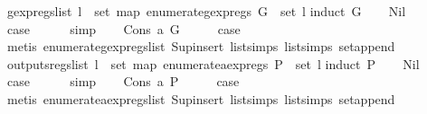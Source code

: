 \begin{isabellebody}
\ gexp{\isacharunderscore}regs{\isacharunderscore}list{\isacharcolon}\ {\isachardoublequoteopen}{\isasymexists}l{\isachardot}\ {\isasymUnion}\ {\isacharparenleft}set\ {\isacharparenleft}map\ enumerate{\isacharunderscore}gexp{\isacharunderscore}regs\ G{\isacharparenright}{\isacharparenright}\ {\isacharequal}\ set\ l{\isachardoublequoteclose}\isanewline
%
\isadelimproof
%
\endisadelimproof
%
\isatagproof
{}\isamarkupfalse%
{\isacharparenleft}induct\ G{\isacharparenright}\isanewline
\ \ \isamarkupfalse%
\ Nil\isanewline
\ \ \isamarkupfalse%
\ \isamarkupfalse%
\ {\isacharquery}case\isanewline
\ \ \ \ \isamarkupfalse%
\ simp\isanewline
{}\isamarkupfalse%
\isanewline
\ \ \isamarkupfalse%
\ {\isacharparenleft}Cons\ a\ G{\isacharparenright}\isanewline
\ \ \isamarkupfalse%
\ \isamarkupfalse%
\ {\isacharquery}case\isanewline
\ \ \ \ \isamarkupfalse%
\ {\isacharparenleft}metis\ enumerate{\isacharunderscore}gexp{\isacharunderscore}regs{\isacharunderscore}list\ Sup{\isacharunderscore}insert\ list{\isachardot}simps{\isacharparenleft}{}{}{\isacharparenright}\ list{\isachardot}simps{\isacharparenleft}{}{\isacharparenright}\ set{\isacharunderscore}append{\isacharparenright}\isanewline
{}\isamarkupfalse%
%
\endisatagproof
{\isafoldproof}%
%
\isadelimproof
\isanewline
%
\endisadelimproof
\isanewline
{}\isamarkupfalse%
\ outputs{\isacharunderscore}regs{\isacharunderscore}list{\isacharcolon}\ {\isachardoublequoteopen}{\isasymexists}l{\isachardot}\ {\isasymUnion}\ {\isacharparenleft}set\ {\isacharparenleft}map\ enumerate{\isacharunderscore}aexp{\isacharunderscore}regs\ P{\isacharparenright}{\isacharparenright}\ {\isacharequal}\ set\ l{\isachardoublequoteclose}\isanewline
%
\isadelimproof
%
\endisadelimproof
%
\isatagproof
{}\isamarkupfalse%
{\isacharparenleft}induct\ P{\isacharparenright}\isanewline
\ \ \isamarkupfalse%
\ Nil\isanewline
\ \ \isamarkupfalse%
\ \isamarkupfalse%
\ {\isacharquery}case\isanewline
\ \ \ \ \isamarkupfalse%
\ simp\isanewline
{}\isamarkupfalse%
\isanewline
\ \ \isamarkupfalse%
\ {\isacharparenleft}Cons\ a\ P{\isacharparenright}\isanewline
\ \ \isamarkupfalse%
\ \isamarkupfalse%
\ {\isacharquery}case\isanewline
\ \ \ \ \isamarkupfalse%
\ {\isacharparenleft}metis\ enumerate{\isacharunderscore}aexp{\isacharunderscore}regs{\isacharunderscore}list\ Sup{\isacharunderscore}insert\ list{\isachardot}simps{\isacharparenleft}{}{}{\isacharparenright}\ list{\isachardot}simps{\isacharparenleft}{}{\isacharparenright}\ set{\isacharunderscore}append{\isacharparenright}\isanewline

\end{isabellebody}
